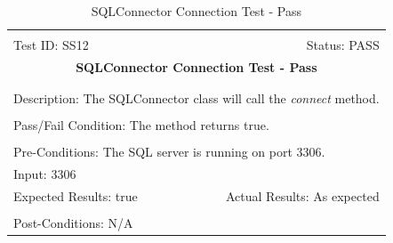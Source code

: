 \documentclass[11pt]{article}
\begin{document}
\begin{center}
\begin{table}[H]
\begin{tabular}{|l r|}\hline&\\[-2mm]
	Test ID: SS12	&Status: PASS\\[-3mm]
	\multicolumn{2}{|c|}{\textbf{\large{SQLConnector Connection Test - Pass}}}\\&\\\hline&\\[-3mm]
	\multicolumn{2}{|p{\textwidth}|}{Description: The SQLConnector class will call the \textit{connect} method.}\\[1mm]\hline&\\[-3mm]
	\multicolumn{2}{|p{\textwidth}|}{Pass/Fail Condition: The method returns true.}\\[1mm]\hline&\\[-3mm]
	\multicolumn{2}{|p{\textwidth}|}{Pre-Conditions: The SQL server is running on port 3306.}\\[4mm]
	\multicolumn{2}{|p{\textwidth}|}{Input: 3306}\\[2mm]\hline
	\multicolumn{1}{|p{0.49\textwidth}}{Expected Results: true}	&\multicolumn{1}{|p{0.45\textwidth}|}{Actual Results: As expected}\\\hline&\\[-3mm]
	\multicolumn{2}{|p{\textwidth}|}{Post-Conditions: N/A}\\\hline
\end{tabular}
\caption{SQLConnector Connection Test - Pass}
\end{table}
\end{center}
\end{document}
